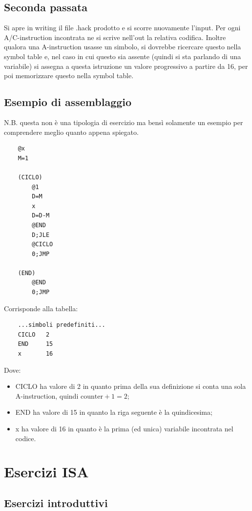 \documentclass[12pt]{article}
\begin{document}
\subsection{Seconda passata}
\label{proc_second}
Si apre in writing il file .hack prodotto e si scorre nuovamente l'input.
Per ogni A/C-instruction incontrata ne si scrive nell'out la relativa codifica.
Inoltre qualora una A-instruction usasse un simbolo, si dovrebbe ricercare questo nella symbol table e, nel caso in cui questo sia assente (quindi si sta parlando di una variabile) si assegna a questa istruzione un valore progressivo a partire da 16, per poi memorizzare questo nella symbol table. 

\subsection{Esempio di assemblaggio}
N.B. questa non è una tipologia di esercizio ma bensì solamente un esempio per comprendere meglio quanto appena spiegato.
\begin{lstlisting}
    @x
    M=1

    (CICLO)
        @1
        D=M
        x
        D=D-M
        @END
        D;JLE
        @CICLO
        0;JMP

    (END)
        @END
        0;JMP
\end{lstlisting}

Corrisponde alla tabella:
\begin{lstlisting}
    ...simboli predefiniti...
    CICLO   2
    END     15
    x       16
\end{lstlisting}
Dove:
\begin{itemize}
    \item CICLO ha valore di 2 in quanto prima della sua definizione si conta una sola A-instruction, quindi $\text{counter}+1=2$;
    \item END ha valore di 15 in quanto la riga seguente è la quindicesima;
    \item x ha valore di 16 in quanto è la prima (ed unica) variabile incontrata nel codice.
\end{itemize}

\section{Esercizi ISA}
\label{sec:ISA_exercises}

\subsection{Esercizi introduttivi}
\label{ssec:ISA_beginner_friendly}
\end{document}
